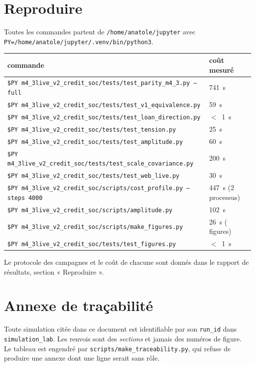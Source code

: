 \documentclass[11pt,a4paper]{article}
\newcommand{\code}[1]{\texttt{#1}}
\begin{document}
\section{Reproduire}
\label{sec:reproduire-conception}

Toutes les commandes partent de \code{/home/anatole/jupyter} avec
\code{PY=/home/anatole/jupyter/.venv/bin/python3}.

\begin{center}\footnotesize
\begin{tabular}{@{}p{9.4cm}p{4.2cm}@{}}
\toprule
\textbf{commande} & \textbf{coût mesuré} \\
\midrule
\code{\$PY m4\_3live\_v2\_credit\_soc/tests/test\_parity\_m4\_3.py --full} &
741~s \\
\code{\$PY m4\_3live\_v2\_credit\_soc/tests/test\_v1\_equivalence.py} &
59~s \\
\code{\$PY m4\_3live\_v2\_credit\_soc/tests/test\_loan\_direction.py} &
$<$~1~s \\
\code{\$PY m4\_3live\_v2\_credit\_soc/tests/test\_tension.py} & 25~s \\
\code{\$PY m4\_3live\_v2\_credit\_soc/tests/test\_amplitude.py} & 60~s \\
\code{\$PY m4\_3live\_v2\_credit\_soc/tests/test\_scale\_covariance.py} &
200~s \\
\code{\$PY m4\_3live\_v2\_credit\_soc/tests/test\_web\_live.py} & 30~s \\
\code{\$PY m4\_3live\_v2\_credit\_soc/scripts/cost\_profile.py --steps 4000} &
447~s (2 processus) \\
\code{\$PY m4\_3live\_v2\_credit\_soc/scripts/amplitude.py} & 102~s \\
\code{\$PY m4\_3live\_v2\_credit\_soc/scripts/make\_figures.py} & 26~s (\nombreFigures{} figures) \\
\code{\$PY m4\_3live\_v2\_credit\_soc/tests/test\_figures.py} & $<$~1~s \\
\bottomrule
\end{tabular}
\end{center}

\noindent Le protocole des campagnes et le coût de chacune sont donnés dans le
rapport de résultats, section « Reproduire ».

\appendix
\section{Annexe de traçabilité}
\label{sec:tracabilite-conception}

Toute simulation citée dans ce document est identifiable par son
\code{run\_id} dans \code{simulation\_lab}. Les renvois sont des
\emph{sections} et jamais des numéros de figure. Le tableau est engendré par
\code{scripts/make\_traceability.py}, qui refuse de produire une annexe dont
une ligne serait sans rôle.


\end{document}
